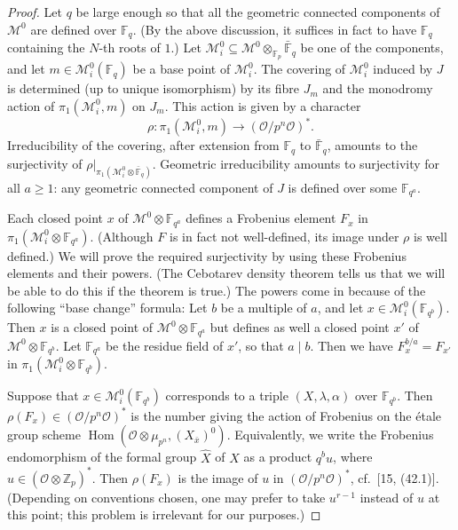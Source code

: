 \documentclass[12pt,a4paper]{article}
\theoremstyle{plain}
\theoremstyle{definition}
\DeclareMathOperator{\Hom}{Hom}
\newcommand{\OO}{\mathcal{O}}
\newcommand{\Z}{\mathbb{Z}}
\newcommand{\F}{\mathbb{F}}
\begin{document}
\begin{proof}
Let $q$ be large enough so that all the geometric connected components of $\mathscr{M}^0$ are defined over $\F_q$. (By the above discussion, it suffices in fact to have $\F_q$ containing the $N$-th roots of $1$.) Let $\mathscr{M}^0_i\subseteq\mathscr{M}^0\otimes_{\F_p}\bar{\F}_q$ be one of the components, and let $m\in\mathscr{M}^0_i(\F_q)$ be a base point of $\mathscr{M}^0_i$. The covering of $\mathscr{M}^0_i$ induced by $J$ is determined (up to unique isomorphism) by its fibre $J_m$ and the monodromy action of $\pi_1(\mathscr{M}^0_i,m)$ on $J_m$. This action is given by a character
\[
\rho:\pi_1(\mathscr{M}^0_i,m)\to(\OO/p^n\OO)^*.
\]
Irreducibility of the covering, after extension from $\F_q$ to $\bar{\F}_q$, amounts to the surjectivity of $\rho|_{\pi_1(\mathscr{M}^0_i\otimes\bar{\F}_q)}$. Geometric irreducibility amounts to surjectivity for all $a\ge1$: any geometric connected component of $J$ is defined over some $\F_{q^a}$.

Each closed point $x$ of $\mathscr{M}^0\otimes\F_{q^a}$ defines a Frobenius element $F_x$ in $\pi_1(\mathscr{M}^0_i\otimes\F_{q^a})$. (Although $F$ is in fact not well-defined, its image under $\rho$ is well defined.) We will prove the required surjectivity by using these Frobenius elements and their powers. (The Cebotarev density theorem tells us that we will be able to do this if the theorem is true.) The powers come in because of the following ``base change'' formula: Let $b$ be a multiple of $a$, and let $x\in\mathscr{M}^0_i(\F_{q^b})$. Then $x$ is a closed point of $\mathscr{M}^0\otimes\F_{q^a}$ but defines as well a closed point $x'$ of $\mathscr{M}^0\otimes\F_{q^b}$. Let $\F_{q^a}$ be the residue field of $x'$, so that $a\mid b$. Then we have $F_x^{b/a}=F_{x'}$ in $\pi_1(\mathscr{M}^0_i\otimes\F_{q^b})$.

Suppose that $x\in\mathscr{M}^0_i(\F_{q^b})$ corresponds to a triple $(X,\lambda,\alpha)$ over $\F_{q^b}$. Then $\rho(F_x)\in(\OO/p^n\OO)^*$ is the number giving the action of Frobenius on the \'etale group scheme $\Hom(\OO\otimes\mu_{p^n},(X_{\bar{x}})^0)$. Equivalently, we write the Frobenius endomorphism of the formal group $\hat{X}$ of $X$ as a product $q^b u$, where $u\in(\OO\otimes\Z_p)^*$. Then $\rho(F_x)$ is the image of $u$ in $(\OO/p^n\OO)^*$, cf.~[15, (42.1)]. (Depending on conventions chosen, one may prefer to take $u^{r-1}$ instead of $u$ at this point; this problem is irrelevant for our purposes.)


\end{proof}
\end{document}
